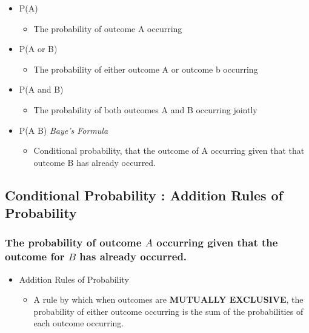 \documentclass[]{article}
\begin{document}
\begin{itemize}
\itemsep1pt\parskip0pt
\item
  P(A)

  \begin{itemize}
  \itemsep1pt\parskip0pt
  \item
    The probability of outcome A occurring
  \end{itemize}
\item
  P(A or B)

  \begin{itemize}
  \itemsep1pt\parskip0pt
  \item
    The probability of either outcome A or outcome b occurring
  \end{itemize}
\item
  P(A and B)

  \begin{itemize}
  \itemsep1pt\parskip0pt
  \item
    The probability of both outcomes A and B occurring jointly
  \end{itemize}
\item
  P(A \textbar{} B) \emph{Baye's Formula}

  \begin{itemize}
  \itemsep1pt\parskip0pt
  \item
    Conditional probability, that the outcome of A occurring given that
    that outcome B has already occurred.
  \end{itemize}
\end{itemize}

\subsection{Conditional Probability : Addition Rules of
Probability}\label{conditional-probability-addition-rules-of-probability}

\subsubsection{The probability of outcome $A$ occurring given that the
outcome for $B$ has already
occurred.}\label{the-probability-of-outcome-a-occurring-given-that-the-outcome-for-b-has-already-occurred.}

\begin{itemize}
\itemsep1pt\parskip0pt
\item
  Addition Rules of Probability

  \begin{itemize}
  \itemsep1pt\parskip0pt
  \item
    A rule by which when outcomes are \textbf{MUTUALLY EXCLUSIVE}, the
    probability of either outcome occurring is the sum of the
    probabilities of each outcome occurring.
  \end{itemize}
\end{itemize}
\end{document}
